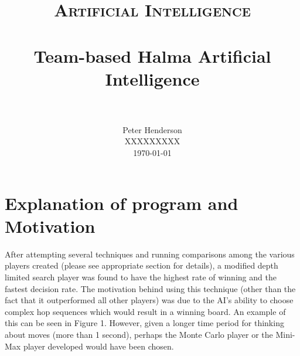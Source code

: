 \documentclass[paper=a4, fontsize=11pt]{scrartcl}
\title{
		\usefont{OT1}{bch}{b}{n}
		\normalfont \normalsize \textsc{Artificial Intelligence} \\ [25pt]
		\horrule{0.5pt} \\[0.4cm]
		\huge Team-based Halma Artificial Intelligence\\
		\horrule{2pt} \\[0.5cm]
}
\author{
		\normalfont 								\normalsize
        Peter Henderson\\[-3pt]		\normalsize
        XXXXXXXXX\\ \normalsize
        \today
}
\date{}
\numberwithin{equation}{section}		%
\numberwithin{figure}{section}			%
\numberwithin{table}{section}				%
\begin{document}
\maketitle
\section{Explanation of program and Motivation}

After attempting several techniques and running comparisons among the various players created (please see appropriate section for details), a modified depth limited search player was found to have the highest rate of winning and the fastest decision rate. The motivation behind using this technique (other than the fact that it outperformed all other players) was due to the AI's ability to choose complex hop sequences which would result in a winning board. An example of this can be seen in Figure 1. However, given a longer time period for thinking about moves (more than 1 second), perhaps the Monte Carlo player or the Mini-Max player developed would have been chosen. 
\end{document}
